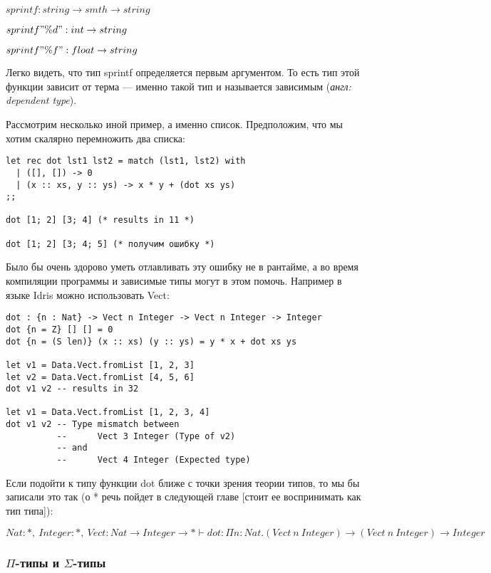     $sprintf : string \rightarrow smth \rightarrow string$
    
    $sprintf "\%d" : int \rightarrow string$
    
    $sprintf "\%f" : float \rightarrow string$
    
Легко видеть, что тип sprintf определяется первым аргументом. То есть тип этой функции зависит от терма — именно такой тип и называется зависимым (\textit{англ: dependent type}). 

Рассмотрим несколько иной пример, а именно список. Предположим, что мы хотим скалярно перемножить два списка: 

\begin{verbatim}
let rec dot lst1 lst2 = match (lst1, lst2) with
  | ([], []) -> 0
  | (x :: xs, y :: ys) -> x * y + (dot xs ys)
;;

dot [1; 2] [3; 4] (* results in 11 *)

dot [1; 2] [3; 4; 5] (* получим ошибку *)

\end{verbatim}

Было бы очень здорово уметь отлавливать эту ошибку не в рантайме, а во время компиляции программы и зависимые типы могут в этом помочь. Например в языке Idris можно использовать Vect: 

\begin{verbatim}
dot : {n : Nat} -> Vect n Integer -> Vect n Integer -> Integer
dot {n = Z} [] [] = 0
dot {n = (S len)} (x :: xs) (y :: ys) = y * x + dot xs ys 

let v1 = Data.Vect.fromList [1, 2, 3]
let v2 = Data.Vect.fromList [4, 5, 6]
dot v1 v2 -- results in 32

let v1 = Data.Vect.fromList [1, 2, 3, 4]
dot v1 v2 -- Type mismatch between
          --      Vect 3 Integer (Type of v2)
          -- and
          --      Vect 4 Integer (Expected type)
\end{verbatim}

Если подойти к типу функции dot ближе с точки зрения теории типов, то мы бы записали это так (о * речь пойдет в следующей главе [стоит ее воспринимать как тип типа]):

$Nat : *,\ Integer : *,\ Vect : Nat \rightarrow Integer \rightarrow * \vdash dot : \Pi n : Nat. (Vect\ n\ Integer) \rightarrow (Vect\ n\ Integer) \rightarrow Integer$

\subsubsection{$\Pi$-типы и $\Sigma$-типы}

